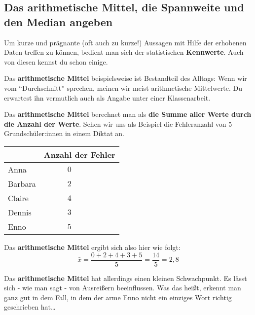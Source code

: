 \documentclass[
  ngerman,
]{book}
\begin{document}
\hypertarget{section-19}{%
\subsubsection*{}\label{section-19}}

\hypertarget{section-20}{%
\subsubsection*{}\label{section-20}}

\hypertarget{das-arithmetische-mittel-die-spannweite-und-den-median-angeben}{%
\subsection*{Das arithmetische Mittel, die Spannweite und den Median angeben}\label{das-arithmetische-mittel-die-spannweite-und-den-median-angeben}}

Um kurze und prägnante (oft auch zu kurze!) Aussagen mit Hilfe der erhobenen Daten treffen zu können, bedient man sich der statistischen \textbf{Kennwerte}. Auch von diesen kennst du schon einige.

Das \textbf{arithmetische Mittel} beispielsweise ist Bestandteil des Alltags: Wenn wir vom ``Durchschnitt'' sprechen, meinen wir meist arithmetische Mittelwerte. Du erwartest ihn vermutlich auch als Angabe unter einer Klassenarbeit.

Das \textbf{arithmetische Mittel} berechnet man als \textbf{die Summe aller Werte durch die Anzahl der Werte}. Sehen wir uns als Beispiel die Fehleranzahl von 5 Grundschüler:innen in einem Diktat an.

\begin{longtable}[]{@{}ll@{}}
\toprule
& Anzahl der Fehler\tabularnewline
\midrule
\endhead
Anna & \(\quad\quad\quad 0\)\tabularnewline
Barbara & \(\quad\quad\quad 2\)\tabularnewline
Claire & \(\quad\quad\quad 4\)\tabularnewline
Dennis & \(\quad\quad\quad 3\)\tabularnewline
Enno & \(\quad\quad\quad 5\)\tabularnewline
\bottomrule
\end{longtable}

Das \textbf{arithmetische Mittel} ergibt sich also hier wie folgt:
\[\bar{x} = \frac{0+2+4+3+5}{5} = \frac{14}{5} =2,8\]

Das \textbf{arithmetische Mittel} hat allerdings einen kleinen Schwachpunkt. Es lässt sich - wie man sagt - von Ausreißern beeinflussen. Was das heißt, erkennt man ganz gut in dem Fall, in dem der arme Enno nicht ein einziges Wort richtig geschrieben hat\ldots{}
\end{document}
